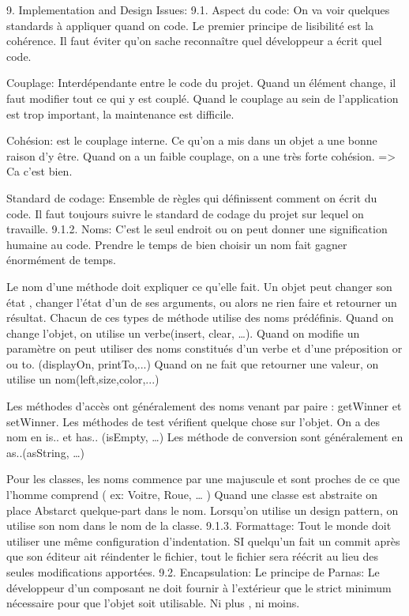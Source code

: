 9. Implementation and Design Issues:
9.1. Aspect du code:
On va voir quelques standards à appliquer quand on code.
Le premier principe de lisibilité est la cohérence. Il faut éviter qu’on sache reconnaître quel développeur a écrit quel code.

Couplage: Interdépendante entre le code du projet. Quand un élément change, il faut modifier tout ce qui y est couplé. Quand le couplage au sein de l’application est trop important, la maintenance est difficile.

Cohésion: est le couplage interne. Ce qu’on a mis dans un objet a une bonne raison d’y être.
Quand on a un faible couplage, on a une très forte cohésion. => Ca c’est bien.

Standard de codage: Ensemble de règles qui définissent comment on écrit du code.
Il faut toujours suivre le standard de codage du projet sur lequel on travaille.
9.1.2. Noms:
C’est le seul endroit ou on peut donner une signification humaine au code.
Prendre le temps de bien choisir un nom fait gagner énormément de temps.

Le nom d’une méthode doit expliquer ce qu’elle fait. Un objet peut changer son état , changer l’état d’un de ses arguments, ou alors ne rien faire et retourner un résultat. Chacun de ces types de méthode utilise des noms prédéfinis.
Quand on change l’objet, on utilise un verbe(insert, clear, …).
Quand on modifie un paramètre on peut utiliser des noms constitués d’un verbe et d’une préposition or ou to. (displayOn, printTo,...) 
Quand on ne fait que retourner une valeur, on utilise un nom(left,size,color,...)

Les méthodes d’accès ont généralement des noms venant par paire : getWinner et setWinner.
Les méthodes de test vérifient quelque chose sur l’objet. On a des nom en is.. et has.. (isEmpty, …)
Les méthode de conversion sont généralement en as..(asString, …)

Pour les classes, les noms commence par une majuscule et sont proches de ce que l’homme comprend ( ex: Voitre, Roue, … )
Quand une classe est abstraite on place Abstarct quelque-part dans le nom.
Lorsqu’on utilise un design pattern, on utilise son nom dans le nom de la classe.
9.1.3. Formattage:
Tout le monde doit utiliser une même configuration d’indentation.
SI quelqu’un fait un commit après que son éditeur ait réindenter le fichier, tout le fichier sera réécrit au lieu des seules modifications apportées.
9.2. Encapsulation:
Le principe de Parnas: Le développeur d’un composant ne doit fournir à l’extérieur que le strict minimum nécessaire pour que l’objet soit utilisable. Ni plus , ni moins.

